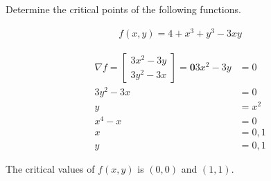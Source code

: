 Determine the critical points of the following functions.

\begin{align*}
    f(x, y) = 4 + x^3 + y^3 - 3xy
\end{align*}

\begin{solution}
\begin{align*}
    \nabla f = \begin{bmatrix}
        3x^2 - 3y \\
        3y^2 - 3x
    \end{bmatrix} = \boldsymbol{0}
    3x^2 - 3y &= 0 \\
    3y^2 - 3x &= 0 \\
    y &= x^2 \\
    x^4 - x &= 0 \\
    x &= 0, 1 \\
    y &= 0, 1
\end{align*}

The critical values of $f(x, y)$ is $(0, 0)$ and $(1, 1)$.
\end{solution}
